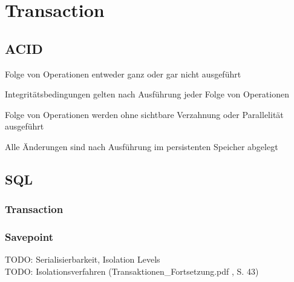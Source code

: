 \section{Transaction}
    \subsection{ACID}
    \begin{description}
    \setlength{\itemsep}{0pt} 
        \item[Atomicity] Folge von Operationen entweder ganz oder gar nicht ausgeführt
        \item[Consistency] Integritätsbedingungen gelten nach Ausführung jeder Folge von Operationen
        \item[Isolation] Folge von Operationen werden ohne sichtbare Verzahnung oder Parallelität ausgeführt
        \item[Durability] Alle Änderungen sind nach Ausführung im persistenten Speicher abgelegt
    \end{description}
    
    \subsection{SQL}
        \subsubsection{Transaction}
            
        \subsubsection{Savepoint}
            
    TODO: Serialisierbarkeit, Isolation Levels \\
    TODO: Isolationsverfahren (Transaktionen\_Fortsetzung.pdf , S. 43)